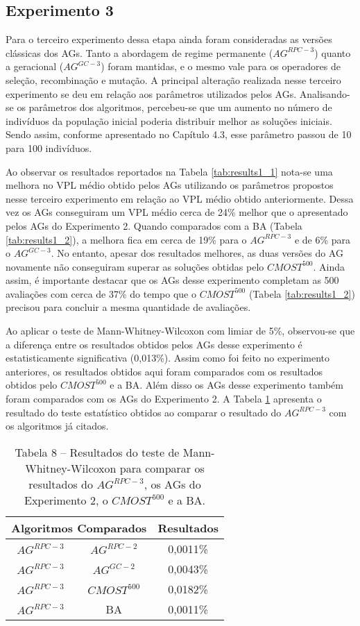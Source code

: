 \subsection{Experimento 3}

Para o terceiro experimento dessa etapa ainda foram consideradas as versões clássicas dos AGs. Tanto a abordagem de regime permanente ($AG^{RPC-3}$) quanto a geracional ($AG^{GC-3}$) foram mantidas, e o mesmo vale para os operadores de seleção, recombinação e mutação. A principal alteração realizada nesse terceiro experimento se deu em relação aos parâmetros utilizados pelos AGs. Analisando-se os parâmetros dos algoritmos, percebeu-se que um aumento no número de indivíduos da população inicial poderia distribuir melhor as soluções iniciais. Sendo assim, conforme apresentado no Capítulo 4.3, esse parâmetro passou de 10 para 100 indivíduos.

Ao observar os resultados reportados na Tabela \ref{tab:results1_1} nota-se uma melhora no VPL médio obtido pelos AGs utilizando os parâmetros propostos nesse terceiro experimento em relação ao VPL médio obtido anteriormente. Dessa vez os AGs conseguiram um VPL médio cerca de 24\% melhor que o apresentado pelos AGs do Experimento 2. Quando comparados com a BA (Tabela \ref{tab:results1_2}), a melhora fica em cerca de 19\% para o $AG^{RPC-3}$ e de 6\% para o $AG^{GC-3}$. No entanto, apesar dos resultados melhores, as duas versões do AG novamente não conseguiram superar as soluções obtidas pelo $CMOST^{500}$. Ainda assim, é importante destacar que os AGs desse experimento completam as 500 avaliações com cerca de 37\% do tempo que o $CMOST^{500}$ (Tabela \ref{tab:results1_2}) precisou para concluir a mesma quantidade de avaliações.

Ao aplicar o teste de Mann-Whitney-Wilcoxon com limiar de 5\%, observou-se que a diferença entre os resultados obtidos pelos AGs desse experimento é estatisticamente significativa (0,013\%). Assim como foi feito no experimento anteriores, os resultados obtidos aqui foram comparados com os resultados obtidos pelo $CMOST^{500}$ e a BA. Além disso os AGs desse experimento também foram comparados com os AGs do Experimento 2. A Tabela \ref{tab:mw3_1} apresenta o resultado do teste estatístico obtidos ao comparar o resultado do $AG^{RPC-3}$ com os algoritmos já citados.

\begin{table}[H]
\centering
\caption{Tabela 8 – Resultados do teste de Mann-Whitney-Wilcoxon para comparar os resultados do $AG^{RPC-3}$, os AGs do Experimento 2, o $CMOST^500$ e a BA.}
\label{tab:mw3_1}
\begin{tabular}{|c|c|c|}
\hline
\multicolumn{2}{|c|}{Algoritmos Comparados} & Resultados \\ \hline
$AG^{RPC-3}$ & $AG^{RPC-2}$ & 0,0011\% \\ \hline
$AG^{RPC-3}$ & $AG^{GC-2}$ & 0,0043\% \\ \hline
$AG^{RPC-3}$ & $CMOST^500$ & 0,0182\% \\ \hline
$AG^{RPC-3}$ & BA & 0,0011\% \\ \hline

\end{tabular}
\end{table}

